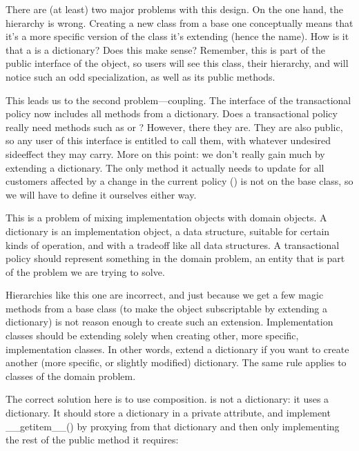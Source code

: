 \documentclass[a4paper,10pt,english]{sphinxmanual}
\begin{document}
There are (at least) two major problems with this design. On the one hand, the hierarchy is wrong. Creating a
new class from a base one conceptually means that it’s a more specific version of the class it’s extending
(hence the name). How is it that a  is a dictionary? Does this make sense? Remember,
this is part of the public interface of the object, so users will see this class, their hierarchy, and will
notice such an odd specialization, as well as its public methods.

This leads us to the second problem—coupling. The interface of the transactional policy now includes all
methods from a dictionary. Does a transactional policy really need methods such as  or ?
However, there they are. They are also public, so any user of this interface is entitled to call them, with
whatever undesired side\sphinxhyphen{}effect they may carry. More on this point: we don’t really gain much by extending a
dictionary. The only method it actually needs to update for all customers affected by a change in the current
policy () is not on the base class, so we will have to define it ourselves either way.

This is a problem of mixing implementation objects with domain objects. A dictionary is an implementation
object, a data structure, suitable for certain kinds of operation, and with a trade\sphinxhyphen{}off like all data
structures. A transactional policy should represent something in the domain problem, an entity that is part of
the problem we are trying to solve.

Hierarchies like this one are incorrect, and just because we get a few magic methods from a base class (to
make the object subscriptable by extending a dictionary) is not reason enough to create such an extension.
Implementation classes should be extending solely when creating other, more specific, implementation classes.
In other words, extend a dictionary if you want to create another (more specific, or slightly modified)
dictionary. The same rule applies to classes of the domain problem.

The correct solution here is to use composition.  is not a dictionary: it uses a
dictionary. It should store a dictionary in a private attribute, and implement \_\_getitem\_\_() by proxying from
that dictionary and then only implementing the rest of the public method it requires:
\end{document}
